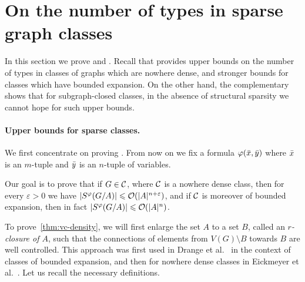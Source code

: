 \section{On the number of types in sparse graph classes}\label{sec:types}

In this section we prove  and .
	Recall that  provides upper bounds on the number of types in classes of graphs which are nowhere dense, 
	and stronger bounds for classes which have bounded expansion. 
	On the other hand, the complementary  shows that for subgraph-closed classes, in the absence of structural sparsity we cannot hope for such upper bounds.

\paragraph*{Upper bounds for sparse classes.}
We first concentrate on proving .
From now on we fix a formula  $\varphi(\bar{x},\bar{y})$ where
$\bar{x}$ is an $m$-tuple and $\bar{y}$ is an $n$-tuple of variables.

Our goal is to prove that if $G\in \mathcal{C}$, where $\mathcal{C}$ is a nowhere dense class,
then for every $\varepsilon>0$ we have  $|S^\varphi(G/A)|\leqslant \mathcal{O}(|A|^{n+\varepsilon})$, and 
if $\mathcal{C}$ is moreover of bounded expansion, then in fact $|S^\varphi(G/A)|\leqslant \mathcal{O}(|A|^n)$.


To prove~\cref{thm:vc-density},
we will first enlarge the set $A$ to a set $B$, called
an \emph{$r$-closure of $A$}, such 
that the connections of elements from $V(G)\setminus B$ 
towards $B$ are well controlled. This approach
was first used in Drange et al.~\cite{drange2016kernelization} in the context of classes of bounded expansion, 
and then for nowhere dense classes in Eickmeyer et al.~\cite{eickmeyer2016neighborhood}. 
Let us recall the necessary definitions.

